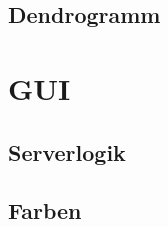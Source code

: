 \documentclass[12pt]{article}
\begin{document}
\subsection{Dendrogramm}
\label{dendrogramm}

\newpage
\pagestyle{fancy}
\fancyhead{}
\section{GUI}
\label{gui}

\subsection{Serverlogik}
\label{serverlogik}


\newpage
\pagestyle{fancy}
\fancyhead{}
\subsection{Farben}
\end{document}
